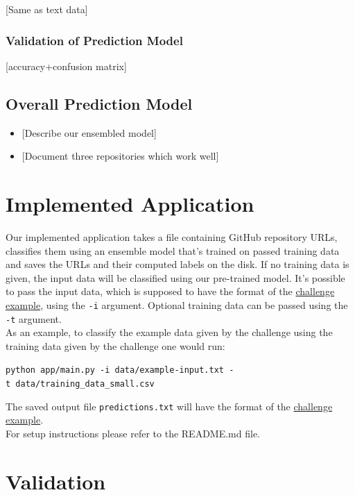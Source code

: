 \documentclass{article}
\providecommand{\tightlist}{%
  \setlength{\itemsep}{0pt}\setlength{\parskip}{0pt}}
\begin{document}
{[}Same as text data{]}

\subsubsection{Validation of Prediction
Model}\label{validation-of-prediction-model-2}

{[}accuracy+confusion matrix{]}

\subsection{Overall Prediction
Model}\label{overall-prediction-model}

\begin{itemize}
\tightlist
\item
  {[}Describe our ensembled model{]}
\item
  {[}Document three repositories which work well{]}
\end{itemize}

\section{Implemented Application}\label{implemented-application}

Our implemented application takes a file containing GitHub repository
URLs, classifies them using an ensemble model that's trained on passed
training data and saves the URLs and their computed labels on the disk.
If no training data is given, the input data will be classified using
our pre-trained model. It's possible to pass the input data, which is
supposed to have the format of the
\href{https://github.com/InformatiCup/InformatiCup2017/blob/master/example-input}{challenge
example}, using the \texttt{-i} argument. Optional training data can be
passed using the \texttt{-t} argument.\\
As an example, to classify the example data given by the challenge using
the training data given by the challenge one would run: ~

\texttt{python\ app/main.py\ -i\ data/example-input.txt\ -t\ data/training\_data\_small.csv}

The saved output file \texttt{predictions.txt} will have the format of
the
\href{https://github.com/InformatiCup/InformatiCup2017/blob/master/example-output}{challenge
example}.\\
For setup instructions please refer to the README.md file.

\section{Validation}\label{validation}
\end{document}
